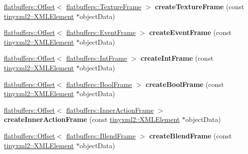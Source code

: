 \begin{DoxyCompactItemize}
\hyperlink{structflatbuffers_1_1Offset}{flatbuffers\+::\+Offset}$<$ \hyperlink{structflatbuffers_1_1TextureFrame}{flatbuffers\+::\+Texture\+Frame} $>$ {\bfseries create\+Texture\+Frame} (const \hyperlink{classtinyxml2_1_1XMLElement}{tinyxml2\+::\+X\+M\+L\+Element} $\ast$object\+Data)
\item 
\mbox{\label{classcocostudio_1_1FlatBuffersSerialize_a5a705d6749812515347bcbe18b2a46b8}} 
\hyperlink{structflatbuffers_1_1Offset}{flatbuffers\+::\+Offset}$<$ \hyperlink{structflatbuffers_1_1EventFrame}{flatbuffers\+::\+Event\+Frame} $>$ {\bfseries create\+Event\+Frame} (const \hyperlink{classtinyxml2_1_1XMLElement}{tinyxml2\+::\+X\+M\+L\+Element} $\ast$object\+Data)
\item 
\mbox{\label{classcocostudio_1_1FlatBuffersSerialize_a968b0a4e24283c2b3f4e73b288792ec0}} 
\hyperlink{structflatbuffers_1_1Offset}{flatbuffers\+::\+Offset}$<$ \hyperlink{structflatbuffers_1_1IntFrame}{flatbuffers\+::\+Int\+Frame} $>$ {\bfseries create\+Int\+Frame} (const \hyperlink{classtinyxml2_1_1XMLElement}{tinyxml2\+::\+X\+M\+L\+Element} $\ast$object\+Data)
\item 
\mbox{\label{classcocostudio_1_1FlatBuffersSerialize_a14de9281eb5278bd9d6cec3bbde21f5d}} 
\hyperlink{structflatbuffers_1_1Offset}{flatbuffers\+::\+Offset}$<$ \hyperlink{structflatbuffers_1_1BoolFrame}{flatbuffers\+::\+Bool\+Frame} $>$ {\bfseries create\+Bool\+Frame} (const \hyperlink{classtinyxml2_1_1XMLElement}{tinyxml2\+::\+X\+M\+L\+Element} $\ast$object\+Data)
\item 
\mbox{\label{classcocostudio_1_1FlatBuffersSerialize_abee08798db0f071cc09c546fc1445676}} 
\hyperlink{structflatbuffers_1_1Offset}{flatbuffers\+::\+Offset}$<$ \hyperlink{structflatbuffers_1_1InnerActionFrame}{flatbuffers\+::\+Inner\+Action\+Frame} $>$ {\bfseries create\+Inner\+Action\+Frame} (const \hyperlink{classtinyxml2_1_1XMLElement}{tinyxml2\+::\+X\+M\+L\+Element} $\ast$object\+Data)
\item 
\mbox{\label{classcocostudio_1_1FlatBuffersSerialize_a6d89022ffef81965f1667a78d688cc4c}} 
\hyperlink{structflatbuffers_1_1Offset}{flatbuffers\+::\+Offset}$<$ \hyperlink{structflatbuffers_1_1BlendFrame}{flatbuffers\+::\+Blend\+Frame} $>$ {\bfseries create\+Blend\+Frame} (const \hyperlink{classtinyxml2_1_1XMLElement}{tinyxml2\+::\+X\+M\+L\+Element} $\ast$object\+Data)

\end{DoxyCompactItemize}
